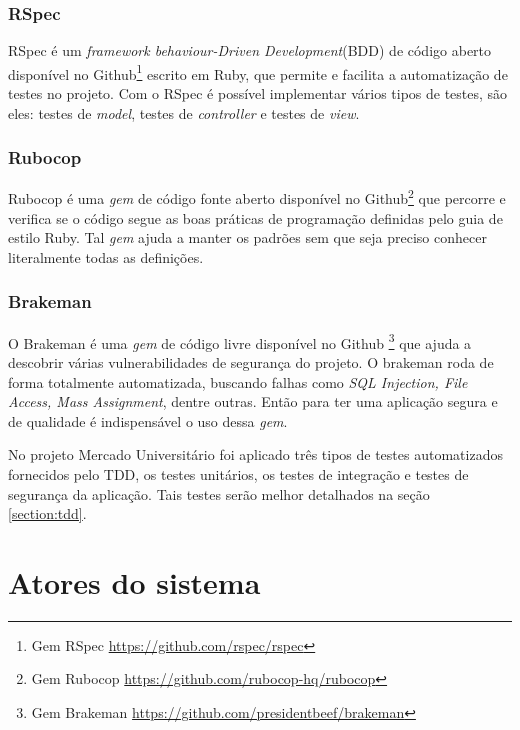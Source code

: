 \subsubsection{RSpec}\label{rspec}
RSpec é um \textit{framework behaviour-Driven Development}(BDD) de código aberto disponível no Github\footnote{Gem RSpec \url{https://github.com/rspec/rspec}} escrito em Ruby, que permite e facilita a automatização de testes no projeto. Com o RSpec é possível implementar vários tipos de testes, são eles: testes de \textit{model}, testes de \textit{controller} e testes de \textit{view}.
\subsubsection{Rubocop}\label{rubocop}
Rubocop é uma \textit{gem} de código fonte aberto disponível no Github\footnote{Gem Rubocop \url{https://github.com/rubocop-hq/rubocop}} que percorre e verifica se o código segue as boas práticas de programação definidas pelo guia de estilo Ruby. Tal \textit{gem} ajuda a manter os padrões sem que seja preciso conhecer literalmente todas as definições.
\subsubsection{Brakeman}\label{brakeman}
O Brakeman é uma \textit{gem} de código livre disponível no Github \footnote{Gem Brakeman \url{https://github.com/presidentbeef/brakeman}} que ajuda a descobrir várias vulnerabilidades de segurança do projeto. O brakeman roda de forma totalmente automatizada, buscando falhas como \textit{SQL Injection, File Access, Mass Assignment}, dentre outras. Então para ter uma aplicação segura e de qualidade é indispensável o uso dessa \textit{gem}.

No projeto Mercado Universitário foi aplicado três tipos de testes automatizados fornecidos pelo TDD, os testes unitários, os testes de integração e testes de segurança da aplicação. Tais testes serão melhor detalhados na seção \ref{section:tdd}.

\section{Atores do sistema}

